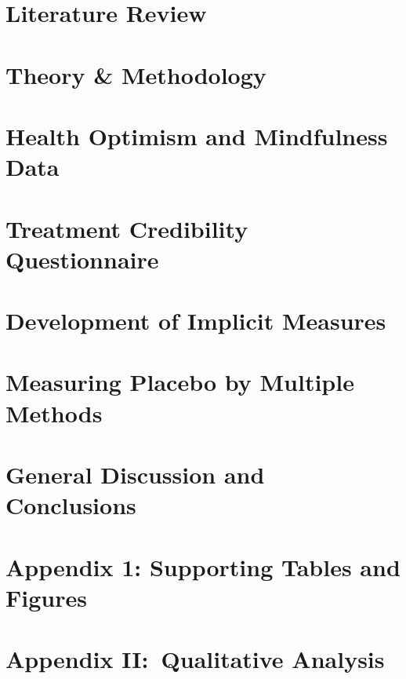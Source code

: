 \documentclass[apsych,phd]{uccthesis}
\begin{document}
\label{cha:intr-rese}


\chapter{Literature Review}
\label{cha:literature-review}


\chapter{Theory \& Methodology}
\label{cha:methodology}


\chapter{Health Optimism and Mindfulness Data}
\label{cha:health-for-thesis}


\chapter{Treatment Credibility Questionnaire}
\label{cha:tcq-thesis}


\chapter{Development of Implicit Measures}
\label{cha:devel-impl-meas}



\chapter{Measuring Placebo by Multiple Methods}
\label{cha:primary-research}


\chapter{General Discussion and Conclusions}
\label{cha:general-discussion}

\appendix
\chapter{Appendix 1: Supporting Tables and Figures}
\label{cha:append-1:-supp}


\chapter{Appendix II:\ Qualitative Analysis}
\label{cha:append-ii:-qual}




\end{document}
